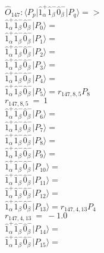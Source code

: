 \documentclass[14pt]{article}
\begin{document}
    $\hat{O}_{147}:  \langle{P_p}\vert \hat{1}_{\alpha}^{+}\hat{1}_{\beta}^{-}\hat{0}_{\beta}^{-} \vert{P_q}\rangle => $ \\ 
    $ \hat{1}_{\alpha}^{+}\hat{1}_{\beta}^{-}\hat{0}_{\beta}^{-} \vert{P_{0}}\rangle =  $ \\ 
    $ \hat{1}_{\alpha}^{+}\hat{1}_{\beta}^{-}\hat{0}_{\beta}^{-} \vert{P_{1}}\rangle =  $ \\ 
    $ \hat{1}_{\alpha}^{+}\hat{1}_{\beta}^{-}\hat{0}_{\beta}^{-} \vert{P_{2}}\rangle =  $ \\ 
    $ \hat{1}_{\alpha}^{+}\hat{1}_{\beta}^{-}\hat{0}_{\beta}^{-} \vert{P_{3}}\rangle =  $ \\ 
    $ \hat{1}_{\alpha}^{+}\hat{1}_{\beta}^{-}\hat{0}_{\beta}^{-} \vert{P_{4}}\rangle =  $ \\ 
    $ \hat{1}_{\alpha}^{+}\hat{1}_{\beta}^{-}\hat{0}_{\beta}^{-} \vert{P_{5}}\rangle = {r}_{147,8,5}P_{8} $ \\ 
    ${r}_{147,8,5}\ =\ 1 $ \\ 
    $ \hat{1}_{\alpha}^{+}\hat{1}_{\beta}^{-}\hat{0}_{\beta}^{-} \vert{P_{6}}\rangle =  $ \\ 
    $ \hat{1}_{\alpha}^{+}\hat{1}_{\beta}^{-}\hat{0}_{\beta}^{-} \vert{P_{7}}\rangle =  $ \\ 
    $ \hat{1}_{\alpha}^{+}\hat{1}_{\beta}^{-}\hat{0}_{\beta}^{-} \vert{P_{8}}\rangle =  $ \\ 
    $ \hat{1}_{\alpha}^{+}\hat{1}_{\beta}^{-}\hat{0}_{\beta}^{-} \vert{P_{9}}\rangle =  $ \\ 
    $ \hat{1}_{\alpha}^{+}\hat{1}_{\beta}^{-}\hat{0}_{\beta}^{-} \vert{P_{10}}\rangle =  $ \\ 
    $ \hat{1}_{\alpha}^{+}\hat{1}_{\beta}^{-}\hat{0}_{\beta}^{-} \vert{P_{11}}\rangle =  $ \\ 
    $ \hat{1}_{\alpha}^{+}\hat{1}_{\beta}^{-}\hat{0}_{\beta}^{-} \vert{P_{12}}\rangle =  $ \\ 
    $ \hat{1}_{\alpha}^{+}\hat{1}_{\beta}^{-}\hat{0}_{\beta}^{-} \vert{P_{13}}\rangle = {r}_{147,4,13}P_{4} $ \\ 
    ${r}_{147,4,13}\ =\ -1.0 $ \\ 
    $ \hat{1}_{\alpha}^{+}\hat{1}_{\beta}^{-}\hat{0}_{\beta}^{-} \vert{P_{14}}\rangle =  $ \\ 
    $ \hat{1}_{\alpha}^{+}\hat{1}_{\beta}^{-}\hat{0}_{\beta}^{-} \vert{P_{15}}\rangle =  $ \\ 
    
\end{document}
